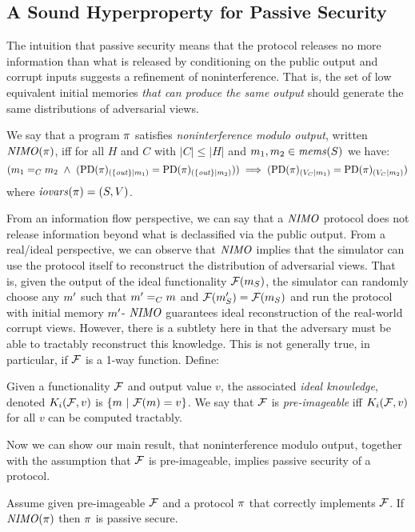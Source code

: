 \subsection{A Sound Hyperproperty for Passive Security}
\label{section-nimo}
The intuition that passive security means that the protocol releases
no more information than what is released by conditioning on the
public output and corrupt inputs suggests a
refinement of noninterference. That is, the set of low equivalent
initial memories \emph{that can produce the same output} should generate the
same distributions of adversarial views.
\begin{definition}
  \label{definition-NIMO}
  We say that a program  $\pi$ satisfies \emph{noninterference modulo output},
  written $\mathit{NIMO}(\pi)$, iff for all $H$ and $C$ with $|C|\le|H|$ and 
  $m_1,m_2 \in \mathit{mems}(S)$ we have:
  $$
  (\store_1 =_C \store_2 \ \wedge \ 
  (\condd{\progd(\prog)}{\{ \outv \}}{\store_1} = \condd{\progd(\prog)}{\{ \outv \}}{\store_2}))
  \implies 
  (\condd{\progd(\prog)}{V_C}{\store_1} = \condd{\progd(\prog)}{V_C}{\store_2})
  $$
  where $\mathit{iovars}(\pi) = (S,V)$.
\end{definition}

From an information flow perspective, we can say that a $\mathit{NIMO}$
protocol does not release information beyond what is declassified
via the public output. From a real/ideal perspective, we can
observe that $\mathit{NIMO}$ implies that the simulator can use
the protocol itself to reconstruct the distribution of adversarial
views. That is, given the output of the ideal functionality
$\mathcal{F}(m_S)$, the simulator can randomly choose any
$m'$ such that $m' =_C m$ and $\mathcal{F}(m'_S) =
\mathcal{F}(m_S)$ and run the protocol with initial memory $m'$-
$\mathit{NIMO}$ guarantees ideal reconstruction of the real-world corrupt views. 
 However, there is a subtlety here in that the adversary
must be able to tractably reconstruct this knowledge. This is not
generally true, in particular, if $\mathcal{F}$ is a 1-way
function. Define:
\begin{definition}
  Given a functionality $\mathcal{F}$ and output value $v$, the associated
  \emph{ideal knowledge}, denoted $K_i(\mathcal{F},v)$ is
  $
  \{ m\ |\ \mathcal{F}(m) = v \}
  $.
  We say that $\mathcal{F}$ is \emph{pre-imageable} iff $K_i(\mathcal{F}, v)$ for all
  $v$ can be computed tractably.
\end{definition}
Now we can show our main result, that noninterference modulo output,
together with the assumption that $\mathcal{F}$ is pre-imageable, implies
passive security of a protocol.
\begin{theorem}
  \label{theorem-nimo}
  Assume given pre-imageable $\mathcal{F}$ and a protocol $\pi$ that
  correctly implements $\mathcal{F}$.  If $\mathit{NIMO}(\pi)$
  then $\pi$ is passive secure.
\end{theorem}

